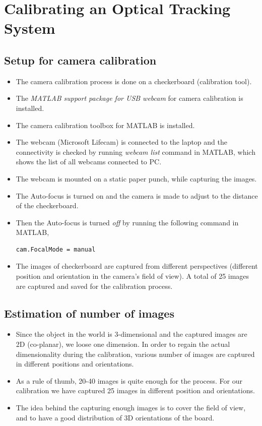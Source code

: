 \documentclass[11pt,a4paper]{article}
\begin{document}
				\section{Calibrating an Optical Tracking System}
				\subsection{Setup for camera calibration }
				\begin{itemize}
					\item The camera calibration process is done on a checkerboard (calibration tool).
					\item The \textit{MATLAB support package for USB webcam} for camera calibration is installed.
					\item The camera calibration toolbox for MATLAB is installed.
					\item The webcam (Microsoft Lifecam) is connected to the laptop and the connectivity is checked by running \textit{webcam list} command in MATLAB, which shows the list of all webcams connected to PC.
					\item The webcam is mounted on a static paper punch, while capturing the images.
					\item The Auto-focus is turned on and the camera is made to adjust to the distance of the checkerboard.
					\item Then the Auto-focus is turned \textit{off} by running the following command in MATLAB,
					\begin{lstlisting}
cam.FocalMode = manual
					\end{lstlisting}
					\item The images of checkerboard are captured from different perspectives (different position and orientation in the camera's field of view). A total of 25 images are captured and saved for the calibration process.
				\end{itemize}
				
				\subsection{Estimation of number of images}
				\begin{itemize}
					\item Since the object in the world is 3-dimensional and the captured images are 2D (co-planar), we loose one dimension. In order to regain the actual dimensionality during the calibration, various number of images are captured in different positions and orientations. 
					\item As a rule of thumb, 20-40 images is quite enough for the process. For our calibration we have captured 25 images in different position and orientations. 
					\item The idea behind the capturing enough images is to cover the field of view, and to have a good distribution of 3D orientations of the board. 
				\end{itemize}
				
\end{document}
